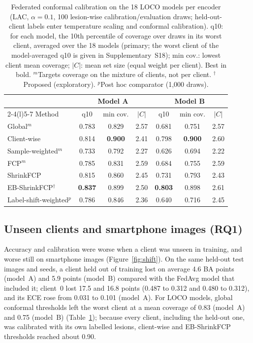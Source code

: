 \documentclass[VANCOUVER,Times1COL]{WileyNJDv5}
\begin{document}
\begin{table}[!t]
\centering
\caption{Federated conformal calibration on the 18 LOCO models per encoder (LAC, $\alpha=0.1$, 100
lesion-wise calibration/evaluation draws; held-out-client labels enter temperature scaling and conformal
calibration). q10: for each model, the 10th percentile of coverage over draws in its worst client, averaged
over the 18 models (primary; the worst client of the model-averaged q10 is given in Supplementary~S18);
min cov.: lowest client mean coverage; $|C|$: mean set size (equal weight
per client). Best in bold. $^m$Targets coverage on the mixture of clients, not per client.
$^\dagger$Proposed (exploratory). $^p$Post hoc comparator (1,000 draws).}
\label{tab:conformal}
\setlength{\tabcolsep}{2.6pt}
\begin{tabular}{@{}lcccccc@{}}
\toprule
 & \multicolumn{3}{c}{Model A} & \multicolumn{3}{c}{Model B} \\
\cmidrule(lr){2-4}\cmidrule(l){5-7}
Method & q10 & min cov. & $|C|$ & q10 & min cov. & $|C|$ \\
\midrule
Global$^m$ & 0.783 & 0.829 & 2.57 & 0.681 & 0.751 & 2.57 \\
Client-wise & 0.814 & \textbf{0.900} & 2.41 & 0.798 & \textbf{0.900} & 2.60 \\
Sample-weighted$^m$ & 0.733 & 0.792 & 2.27 & 0.626 & 0.694 & 2.22 \\
FCP$^m$ & 0.785 & 0.831 & 2.59 & 0.684 & 0.755 & 2.59 \\
ShrinkFCP & 0.815 & 0.860 & 2.45 & 0.731 & 0.793 & 2.43 \\
EB-ShrinkFCP$^\dagger$ & \textbf{0.837} & 0.899 & 2.50 & \textbf{0.803} & 0.898 & 2.61 \\
Label-shift-weighted$^p$ & 0.786 & 0.846 & 2.36 & 0.640 & 0.716 & 2.45 \\
\bottomrule
\end{tabular}
\end{table}


\subsection{Unseen clients and smartphone images (RQ1)}
\label{sec:res-shift}

Accuracy and calibration were worse when a client was unseen in training, and worse still on smartphone
images (Figure~\ref{fig:shift}). On the same held-out test images and seeds, a client held out of training
lost on average 4.6 BA points (model~A) and 5.9 points (model~B) compared with the FedAvg model that
included it; client~0 lost 17.5 and 16.8 points (0.487 to 0.312 and 0.480 to 0.312), and its ECE rose from
0.031 to 0.101 (model~A). For LOCO models, global conformal thresholds left the worst client at a mean
coverage of 0.83 (model~A) and 0.75 (model~B) (Table~\ref{tab:conformal}); because every client, including
the held-out one, was calibrated with its own labelled lesions, client-wise and EB-ShrinkFCP thresholds
reached about 0.90.
\end{document}
